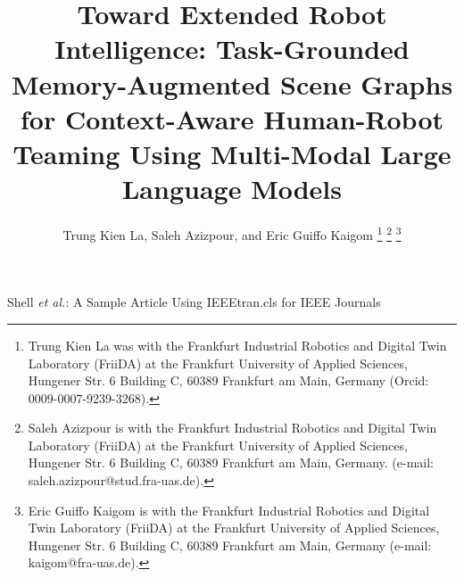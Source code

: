 \documentclass[lettersize,journal]{IEEEtran}
\begin{document}
	
	\title{Toward Extended Robot Intelligence: Task-Grounded Memory-Augmented Scene Graphs for Context-Aware Human-Robot Teaming Using Multi-Modal Large Language Models}
	
	\author{Trung Kien La, Saleh Azizpour, and Eric Guiffo Kaigom
		\thanks{Trung Kien La was with the Frankfurt Industrial Robotics and Digital Twin Laboratory (FriiDA) at the Frankfurt University of Applied Sciences, Hungener Str. 6 Building C, 60389 Frankfurt am Main, Germany (Orcid: 0009-0007-9239-3268).}%
		\thanks{Saleh Azizpour is with the Frankfurt Industrial Robotics and Digital Twin Laboratory (FriiDA) at the Frankfurt University of Applied Sciences, Hungener Str. 6 Building C, 60389 Frankfurt am Main, Germany. (e-mail: saleh.azizpour@stud.fra-uas.de).}%
		\thanks{Eric Guiffo Kaigom is with the Frankfurt Industrial Robotics and Digital Twin Laboratory (FriiDA) at the Frankfurt University of Applied Sciences, Hungener Str. 6 Building C, 60389 Frankfurt am Main, Germany (e-mail: kaigom@fra-uas.de).}}
	
	{Shell \MakeLowercase{\textit{et al.}}: A Sample Article Using IEEEtran.cls for IEEE Journals}
	
	
	\maketitle
	
\end{document}
